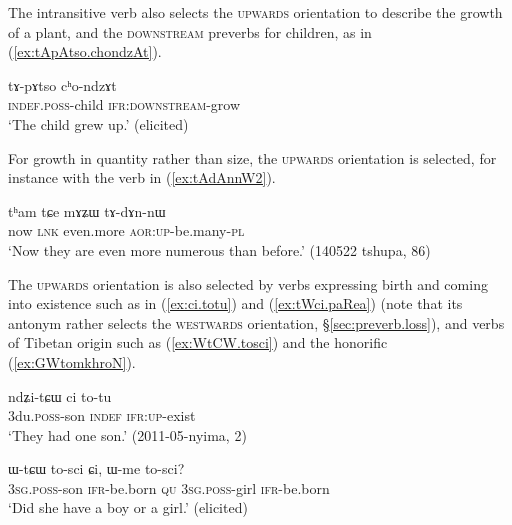 The intransitive verb  also selects the \textsc{upwards} orientation to describe the growth of a plant, and the \textsc{downstream} preverbs for children, as in (\ref{ex:tApAtso.chondzAt}).

\begin{exe}
\ex \label{ex:tApAtso.chondzAt}
\gll   tɤ-pɤtso cʰo-ndzɤt \\
\textsc{indef}.\textsc{poss}-child \textsc{ifr}:\textsc{downstream}-grow \\
\glt  `The child grew up.' (elicited)
\end{exe}

For growth in quantity rather than size, the \textsc{upwards} orientation is selected, for instance with the verb  in (\ref{ex:tAdAnnW2}).

\begin{exe}
\ex \label{ex:tAdAnnW2}
\gll  tʰam tɕe mɤʑɯ tɤ-dɤn-nɯ  \\
now \textsc{lnk} even.more \textsc{aor}:\textsc{up}-be.many-\textsc{pl}  \\
\glt `Now they are even more numerous than before.' (140522 tshupa, 86)
\end{exe}

The \textsc{upwards} orientation is also selected by verbs expressing birth and coming into existence such as  in (\ref{ex:ci.totu}) and (\ref{ex:tWci.paRea}) (note that its antonym  rather selects the \textsc{westwards} orientation, §\ref{sec:preverb.loss}), and verbs of Tibetan origin such as  (\ref{ex:WtCW.tosci}) and the honorific  (\ref{ex:GWtomkhroN}).

\begin{exe}
\ex \label{ex:ci.totu}
\gll  ndʑi-tɕɯ ci to-tu \\
3du.\textsc{poss}-son \textsc{indef} \textsc{ifr}:\textsc{up}-exist \\
\glt `They had one son.' (2011-05-nyima, 2)
\end{exe}

\begin{exe}
\ex \label{ex:WtCW.tosci}
\gll ɯ-tɕɯ to-sci ɕi, ɯ-me to-sci? \\
\textsc{3sg}.\textsc{poss}-son \textsc{ifr}-be.born \textsc{qu} \textsc{3sg}.\textsc{poss}-girl \textsc{ifr}-be.born \\
\glt `Did she have a boy or a girl.' (elicited)
\end{exe}

